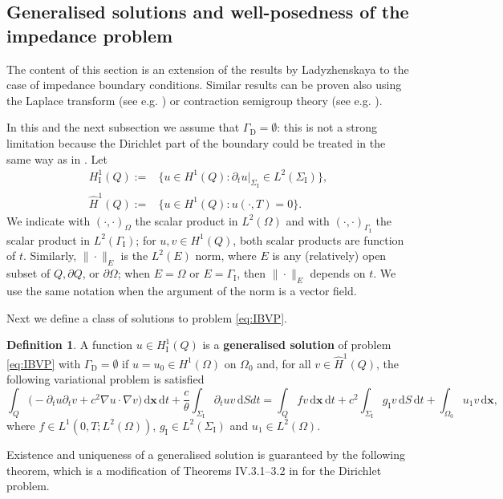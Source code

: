 \documentclass[a4paper]{article}
\theoremstyle{plain}
\theoremstyle{definition}
\newtheorem{definition}{Definition}[section]
\newcommand{\dx}{{\,\mathrm{d}\vect x}}
\newcommand{\dt}{{\,\mathrm{d}t}}
\newcommand{\dS}{{\,\mathrm{d}S}}
\newcommand{\Grad}[1]{\nabla #1}
\newcommand{\TimeDer}{{\partial^{}_t}}
\newcommand{\vect}[1]{\bm{#1}}
\newcommand{\GD}{{\Gamma_{\mathrm D}}}
\newcommand{\GI}{{\Gamma_{\mathrm I}}}
\newcommand{\SI}{{\Sigma_{\mathrm I}}}
\newcommand{\gI}{{g_{\mathrm I}}}
\newcommand{\OZ}{{\Omega_0}}
\newcommand{\HoneImp}{{H^1_{\mathrm I}}}
\begin{document}
\subsection{Generalised solutions and well-posedness of the impedance problem}
\label{sec:Regularity}
The content of this section is an extension of the results by Ladyzhenskaya \cite[Ch.~IV]{ladyzhenskaya-bvp} to the case of impedance boundary conditions. Similar results can be proven also using the Laplace transform (see e.g. \cite{ChaumontFrelet2022}) or contraction semigroup theory (see e.g. \cite{ChaumontFreletEtAl2022}).

In this and the next subsection we assume that $\GD=\emptyset$: this is not a strong limitation because the Dirichlet part of the boundary could be treated in the same way as in \cite{ladyzhenskaya-bvp}.
Let
\begin{align*}
	\HoneImp(Q):=&\{u\in H^1(Q): \TimeDer u|_\SI\in L^2(\SI)\},
	\\
	\widehat{H}^1(Q):=&\{u \in H^1(Q): u(\cdot, T) = 0\}.
\end{align*}
We indicate with $(\cdot, \cdot)_\Omega$ the scalar product in $L^2(\Omega)$ and with $(\cdot, \cdot)_{\GI}$ the scalar product in $L^2(\GI)$; for $u, v \in H^1(Q)$,
both scalar products are
function of $t$.
Similarly, $\| \cdot \|_E$ is the $L^2(E)$ norm, where $E$ is any (relatively) open subset of $Q,\partial Q$, or $\partial\Omega$; when $E=\Omega$ or $E=\GI$, then $\|\cdot\|_E$ depends on $t$.
We use the same notation when the argument of the norm is a vector field.

Next we define a class of solutions to problem \eqref{eq:IBVP}.
\begin{definition}\label{def:imp_gsol}
	A function $u\in \HoneImp(Q)$ is a
	\textbf{generalised solution} of problem \eqref{eq:IBVP}
	with $\GD=\emptyset$ if $u = u_0\in H^1(\Omega)$ on $\OZ$ and, for all $v \in \widehat{H}^1(Q)$, the following
	variational problem
	is satisfied
	\begin{equation}
		\label{eq:imp_varprob}
		\int_Q\big( -\TimeDer u \TimeDer v + c^2 \Grad u \cdot \Grad v\big) \dx \dt + \frac{c}{\theta} \int_\SI \TimeDer u v \dS dt = \int_Q f v \dx \dt + c^2 \int_\SI \gI v \dS \dt + \int_{\Omega_0}u_1 v \dx,
	\end{equation}
	where $f \in L^1(0, T; L^2(\Omega))$, $\gI \in L^2(\SI)$ and $u_1 \in L^2(\Omega)$.
\end{definition}
Existence and uniqueness of a generalised solution is guaranteed by the following theorem, which is a modification of Theorems IV.3.1--3.2 in \cite{ladyzhenskaya-bvp} for the Dirichlet problem.
\end{document}
